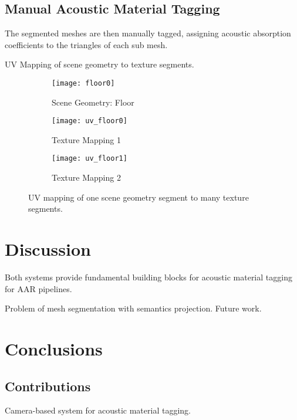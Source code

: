 \subsection{Manual Acoustic Material Tagging}
The segmented meshes are then manually tagged, assigning acoustic absorption coefficients to the triangles of each sub mesh.

UV Mapping of scene geometry to texture segments.

\begin{figure}
    \centering
    \begin{subfigure}{0.75\textwidth}
        \texttt{[image: floor0]}
        \caption{Scene Geometry: Floor}
        \label{fig:floor}
    \end{subfigure}
    \hfill
    \begin{subfigure}{0.42\textwidth}
        \texttt{[image: uv\_floor0]}
        \caption{Texture Mapping 1}
        \label{fig:uv_floor}
    \end{subfigure}
    \hfill
    \begin{subfigure}{0.42\textwidth}
        \texttt{[image: uv\_floor1]}
        \caption{Texture Mapping 2}
        \label{fig:uv_floor2}
    \end{subfigure}
            
    \caption{UV mapping of one scene geometry segment to many texture segments.}
    \label{fig:uv_mapping_demo}
\end{figure}


\section{Discussion}
Both systems provide fundamental building blocks for acoustic material tagging for AAR pipelines.

Problem of mesh segmentation with semantics projection. Future work.

\section{Conclusions}

\subsection{Contributions}
Camera-based system for acoustic material tagging.

